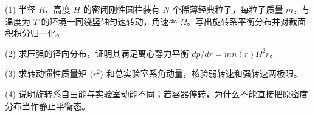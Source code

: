 (1) 半径 \(R\)、高度 \(H\) 的密闭刚性圆柱装有 \(N\) 个稀薄经典粒子，每粒子质量 \(m\)，与温度为 \(T\) 的环境一同绕竖轴匀速转动，角速率 \(\Omega\)。写出旋转系平衡分布并对截面积积分归一化。

(2) 求压强的径向分布，证明其满足离心静力平衡 \(dp/dr=mn(r)\Omega^2r\)。

(3) 求转动惯性质量矩 \(\langle r^2\rangle\) 和总实验室系角动量，核验弱转速和强转速两极限。

(4) 说明旋转系自由能与实验室动能不同；若容器停转，为什么不能直接把原密度分布当作静止平衡态。
